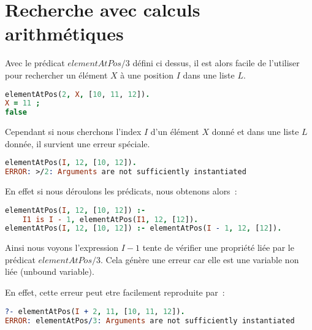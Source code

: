 \section{Recherche avec calculs arithmétiques}

Avec le prédicat $elementAtPos/3$ défini ci dessus, il est alors facile de l'utiliser pour rechercher
un élément $X$ à une position $I$ dans une liste $L$.
\begin{lstlisting}[language=Prolog,frame=single]
elementAtPos(2, X, [10, 11, 12]).
X = 11 ;
false
\end{lstlisting}

Cependant si nous cherchons l'index $I$ d'un élément
$X$ donné et dans une liste $L$ donnée, il survient une erreur spéciale.
\begin{lstlisting}[language=Prolog,frame=single]
elementAtPos(I, 12, [10, 12]).
ERROR: >/2: Arguments are not sufficiently instantiated
\end{lstlisting}

En effet si nous déroulons les prédicats, nous obtenons alors~:
\begin{lstlisting}[language=Prolog,frame=single]
elementAtPos(I, 12, [10, 12]) :-
    I1 is I - 1, elementAtPos(I1, 12, [12]).
elementAtPos(I, 12, [10, 12]) :- elementAtPos(I - 1, 12, [12]).
\end{lstlisting}

Ainsi nous voyons l'expression $I - 1$ tente de vérifier une propriété liée par le prédicat
$elementAtPos/3$. Cela génère une erreur car elle est une variable non liée (unbound variable).

En effet, cette erreur peut etre facilement reproduite par~:
\begin{lstlisting}[language=Prolog,frame=single]
?- elementAtPos(I + 2, 11, [10, 11, 12]).
ERROR: elementAtPos/3: Arguments are not sufficiently instantiated
\end{lstlisting}
